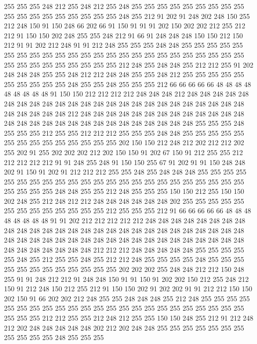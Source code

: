 255 255 255 248 212 255 248 212 255 248 255 255 255 255 255 255 255 255 255 255
255 255 255 255 255 255 255 255 248 255 212 91 202 91 248 202 248 150 255 212
248 150 91 150 248 66 202 66 91 150 91 91 91 202 150 202 202 212 255 212
212 91 150 150 202 248 255 255 248 212 91 66 91 248 248 248 150 150 212 150
212 91 91 202 212 248 91 91 212 248 255 255 255 248 248 255 255 255 255 255
255 255 255 255 255 255 255 255 255 255 255 255 255 255 255 255 255 255 255 255
255 255 255 255 255 255 255 255 212 248 255 248 248 255 212 212 255 91 202 248
248 248 255 255 248 212 212 248 248 255 255 248 212 255 255 255 255 255 255 255
255 255 255 248 255 255 248 255 255 255 212 66 66 66 66 66 48 48 48 48
48 48 48 48 48 91 150 150 212 212 212 212 248 248 248 212 248 248 248 248
248 248 248 248 248 248 248 248 248 248 248 248 248 248 248 248 248 248 248 248
248 248 248 248 248 212 248 248 248 248 248 248 248 248 248 248 248 248 248 248
248 248 248 248 248 248 248 248 248 248 248 248 248 248 255 255 255 248 255 255
255 212 255 255 212 212 212 255 255 255 248 248 255 255 255 255 255 255 255 255
255 255 255 255 255 255 202 150 150 212 248 212 202 212 212 202 255 202 91 255
202 202 202 212 202 150 150 91 202 67 150 91 212 255 255 212 212 212 212 212
91 91 248 255 248 91 150 150 255 67 91 202 91 91 150 248 248 202 91 150
91 202 91 212 212 212 255 255 248 255 248 248 248 255 255 255 255 255 255 255
255 255 255 255 255 255 255 255 255 255 255 255 255 255 255 255 255 255 255 255
248 248 255 255 212 248 255 255 255 150 150 212 255 150 150 202 248 255 212 248
212 212 248 248 248 248 248 248 202 255 255 255 255 255 255 255 255 255 255 255
255 255 212 255 255 255 212 91 66 66 66 66 66 48 48 48 48 48 48 48
48 91 91 202 212 212 212 212 212 248 248 248 248 248 248 248 248 248 248 248
248 248 248 248 248 248 248 248 248 248 248 248 248 248 248 248 248 248 248 248
248 248 248 248 248 248 248 248 248 248 248 248 248 248 248 248 248 248 248 248
248 248 212 212 212 248 248 248 248 248 255 255 255 255 255 248 255 212 255 255
248 255 212 212 248 255 255 255 255 248 255 255 255 255 255 255 255 255 255 255
255 255 202 202 202 255 248 248 212 212 150 248 255 91 91 248 212 212 91 248
248 150 91 91 150 91 202 202 150 212 255 248 212 150 91 212 248 150 212 255
212 91 150 150 202 91 202 202 91 91 212 212 150 150 202 150 91 66 202 202
212 248 255 255 248 248 248 255 212 248 255 255 255 255 255 255 255 255 255 255
255 255 255 255 255 255 255 255 255 255 255 255 255 255 255 255 212 212 255 255
212 248 212 255 255 150 150 248 255 212 91 212 248 212 202 248 248 248 248 248
202 212 202 248 248 255 255 255 255 255 255 255 255 255 255 255 248 255 255 255
